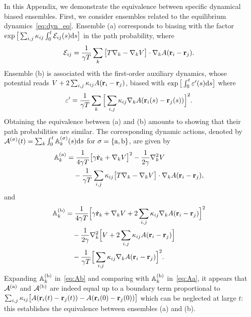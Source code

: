 \documentclass[superscriptaddress, twocolumn, prx, longbibliography, nofootinbib]{revtex4-1}
\begin{document}
In this Appendix, we demonstrate the equivalence between specific dynamical biased ensembles. First, we consider ensembles related to the equilibrium dynamics~\eqref{eq:dyn_eq}. Ensemble (a) corresponds to biasing with the factor $\exp\big[\sum_{i,j} \kappa_{ij}\int_0^t{\cal E}_{ij}(s){\rm d}s\big]$ in the path probability, where
\begin{equation}
	{\cal E}_{ij} = \frac{1}{\gamma T} \sum_k\big[T\nabla_k - \nabla_kV\big]\cdot\nabla_k A({\bf r}_i-{\bf r}_j) .
\end{equation}
Ensemble (b) is associated with the first-order auxiliary dynamics, whose potential reads $V+2\sum_{i,j}\kappa_{ij}A({\bf r}_i-{\bf r}_j)$, biased with $\exp\big[\int_0^t\varepsilon'(s){\rm d}s\big]$ where
\begin{equation}
	\varepsilon' = \frac{1}{\gamma T}\sum_k\Big[\sum_{i,j}\kappa_{ij} \nabla_kA({\bf r}_i(s)-{\bf r}_j(s))\Big]^2 .
\end{equation}
Obtaining the equivalence between (a) and (b) amounts to showing that their path probabilities are similar. The corresponding dynamic actions, denoted by ${\cal A}^{( \sigma)}(t) = \sum_k\int_0^t{\mathbb A}_k^{(\sigma)}(s){\rm d}s$ for $\sigma=\{{\rm a,b}\}$, are given by
\begin{equation}\label{eq:Aa}
	\begin{aligned}
		{\mathbb A}_k^{(\rm a)} &= \frac{1}{4\gamma T} \big[\gamma\dot{\bf r}_k + \nabla_kV\big]^2 - \frac{1}{2\gamma} \nabla^2_kV
		\\
		&\quad - \frac{1}{\gamma T} \sum_{i,j}\kappa_{ij}\big[T \nabla_k - \nabla_k V\big] \cdot\nabla_k A({\bf r}_i-{\bf r}_j) ,
	\end{aligned}
\end{equation}
and
\begin{equation}\label{eq:Ab}
	\begin{aligned}
		{\mathbb A}_k^{(\rm b)}	&= \frac{1}{4\gamma T} \Big[\gamma\dot{\bf r}_k + \nabla_k V + 2\sum_{i,j}\kappa_{ij}\nabla_kA({\bf r}_i-{\bf r}_j)\Big]^2
		\\
		&\quad - \frac{1}{2\gamma} \nabla^2_k \Big[V + 2\sum_{i,j}\kappa_{ij} A({\bf r}_i-{\bf r}_j)\Big]
		\\
		&\quad - \frac{1}{\gamma T}\Big[\sum_{i,j}\kappa_{ij}\nabla_kA({\bf r}_i-{\bf r}_j)\Big]^2 .
	\end{aligned}
\end{equation}
Expanding ${\mathbb A}_k^{(\rm b)}$ in~\eqref{eq:Ab} and comparing with ${\mathbb A}_k^{(\rm b)}$ in~\eqref{eq:Aa}, it appears that ${\cal A}^{(\rm a)}$ and ${\cal A}^{(\rm b)}$ are indeed equal up to a boundary term proportional to $\sum_{i,j}\kappa_{ij}\big[A({\bf r}_i(t)-{\bf r}_j(t)) - A({\bf r}_i(0)-{\bf r}_j(0))\big]$ which can be neglected at large $t$: this establishes the equivalence between ensembles (a) and (b).
\end{document}
